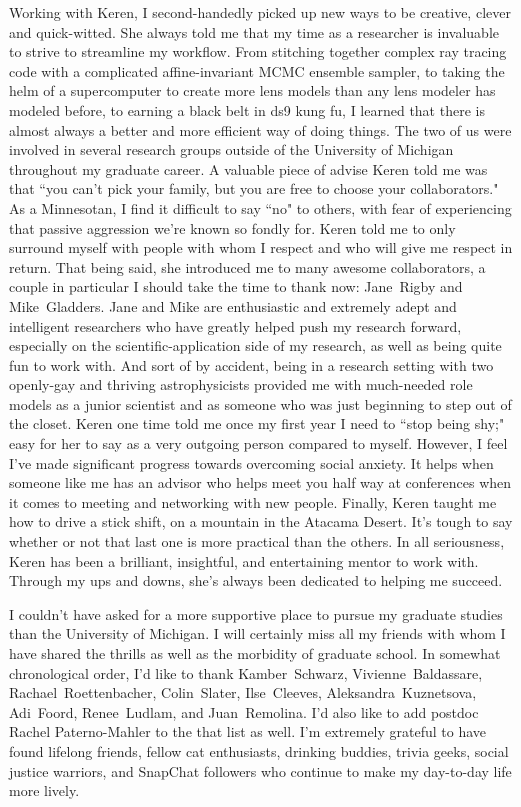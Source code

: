 Working with Keren, I second-handedly picked up new ways to be creative, clever and quick-witted. She always told me that my time as a researcher is invaluable to strive to streamline my workflow. From stitching together complex ray tracing code with a complicated affine-invariant MCMC ensemble sampler, to taking the helm of a supercomputer to create more lens models than any lens modeler has modeled before, to earning a black belt in ds9 kung fu, I learned that there is almost always a better and more efficient way of doing things. The two of us were involved in several research groups outside of the University of Michigan throughout my graduate career. A valuable piece of advise Keren told me was that ``you can't pick your family, but you are free to choose your collaborators." As a Minnesotan, I find it difficult to say ``no" to others, with fear of experiencing that passive aggression we're known so fondly for. Keren told me to only surround myself with people with whom I respect and who will give me respect in return. That being said, she introduced me to many awesome collaborators, a couple in particular I should take the time to thank now: Jane~Rigby and Mike~Gladders. Jane and Mike are enthusiastic and extremely adept and intelligent researchers who have greatly helped push my research forward, especially on the scientific-application side of my research, as well as being quite fun to work with. And sort of by accident, being in a research setting with two openly-gay and thriving astrophysicists provided me with much-needed role models as a junior scientist and as someone who was just beginning to step out of the closet. Keren one time told me once my first year I need to ``stop being shy;" easy for her to say as a very outgoing person compared to myself. However, I feel I've made significant progress towards overcoming social anxiety. It helps when someone like me has an advisor who helps meet you half way at conferences when it comes to meeting and networking with new people. Finally, Keren taught me how to drive a stick shift, on a mountain in the Atacama Desert. It's tough to say whether or not that last one is more practical than the others. In all seriousness, Keren has been a brilliant, insightful, and entertaining mentor to work with. Through my ups and downs, she's always been dedicated to helping me succeed.

I couldn't have asked for a more supportive place to pursue my graduate studies than the University of Michigan. I will certainly miss all my friends with whom I have shared the thrills as well as the morbidity of graduate school. In somewhat chronological order, I'd like to thank Kamber~Schwarz, Vivienne~Baldassare, Rachael~Roettenbacher, Colin~Slater, Ilse~Cleeves, Aleksandra~Kuznetsova, Adi~Foord, Renee~Ludlam, and Juan~Remolina. I'd also like to add postdoc Rachel Paterno-Mahler to the that list as well. I'm extremely grateful to have found lifelong friends, fellow cat enthusiasts, drinking buddies, trivia geeks, social justice warriors, and SnapChat followers who continue to make my day-to-day life more lively.


